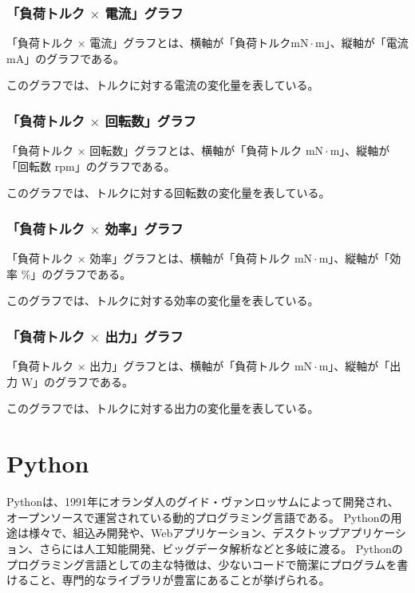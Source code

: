 \subsubsection{「負荷トルク $\times$ 電流」グラフ}\label{sub:sub:torden}
「負荷トルク $\times$ 電流」グラフとは、横軸が「負荷トルク$\mathrm{mN \cdot m}$」、縦軸が「電流 $\mathrm{mA}$」のグラフである。

このグラフでは、トルクに対する電流の変化量を表している。
\subsubsection{「負荷トルク $\times$ 回転数」グラフ}\label{sub:sub:torkaiten}
「負荷トルク $\times$ 回転数」グラフとは、横軸が「負荷トルク $\mathrm{mN \cdot m}$」、縦軸が「回転数 $\mathrm{rpm}$」のグラフである。

このグラフでは、トルクに対する回転数の変化量を表している。
\subsubsection{「負荷トルク $\times$ 効率」グラフ}\label{sub:sub:torkouritu}
「負荷トルク $\times$ 効率」グラフとは、横軸が「負荷トルク $\mathrm{mN \cdot m}$」、縦軸が「効率 $\mathrm{\%}$」のグラフである。

このグラフでは、トルクに対する効率の変化量を表している。
\subsubsection{「負荷トルク $\times$ 出力」グラフ}\label{sub:sub:torsyutu}
「負荷トルク $\times$ 出力」グラフとは、横軸が「負荷トルク $\mathrm{mN \cdot m}$」、縦軸が「出力 $\mathrm{W}$」のグラフである。

このグラフでは、トルクに対する出力の変化量を表している。
  \section{Python}\label{python}
Pythonは、1991年にオランダ人のグイド・ヴァンロッサムによって開発され、オープンソースで運営されている動的プログラミング言語である\cite{pythonoya}。
Pythonの用途は様々で、組込み開発や、Webアプリケーション、デスクトップアプリケーション、さらには人工知能開発、ビッグデータ解析などと多岐に渡る\cite{pythonsamu}。
Pythonのプログラミング言語としての主な特徴は、少ないコードで簡潔にプログラムを書けること、専門的なライブラリが豊富にあることが挙げられる。

